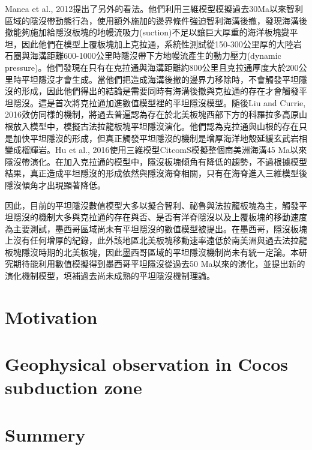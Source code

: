 Manea et al., 2012提出了另外的看法。他們利用三維模型模擬過去30Ma以來智利區域的隱沒帶動態行為，使用額外施加的邊界條件強迫智利海溝後撤，發現海溝後撤能夠施加給隱沒板塊的地幔流吸力(suction)不足以讓巨大厚重的海洋板塊變平坦，因此他們在模型上覆板塊加上克拉通，系統性測試從150-300公里厚的大陸岩石圈與海溝距離600-1000公里時隱沒帶下方地幔流產生的動力壓力(dynamic pressure)。他們發現在只有在克拉通與海溝距離約800公里且克拉通厚度大於200公里時平坦隱沒才會生成。當他們把造成海溝後撤的邊界力移除時，不會觸發平坦隱沒的形成，因此他們得出的結論是需要同時有海溝後撤與克拉通的存在才會觸發平坦隱沒。這是首次將克拉通加進數值模型裡的平坦隱沒模型。隨後Liu and Currie, 2016效仿同樣的機制，將過去普遍認為存在於北美板塊西部下方的科羅拉多高原山根放入模型中，模擬古法拉龍板塊平坦隱沒演化。他們認為克拉通與山根的存在只是加快平坦隱沒的形成，但真正觸發平坦隱沒的機制是增厚海洋地殼延緩玄武岩相變成榴輝岩。Hu et al., 2016使用三維模型CitcomS模擬整個南美洲海溝45 Ma以來隱沒帶演化。在加入克拉通的模型中，隱沒板塊傾角有降低的趨勢，不過根據模型結果，真正造成平坦隱沒的形成依然與隱沒海脊相關，只有在海脊進入三維模型後隱沒傾角才出現顯著降低。

因此，目前的平坦隱沒數值模型大多以擬合智利、祕魯與法拉龍板塊為主，觸發平坦隱沒的機制大多與克拉通的存在與否、是否有洋脊隱沒以及上覆板塊的移動速度為主要測試，墨西哥區域尚未有平坦隱沒的數值模型被提出。在墨西哥，隱沒板塊上沒有任何增厚的紀錄，此外該地區北美板塊移動速率遠低於南美洲與過去法拉龍板塊隱沒時期的北美板塊，因此墨西哥區域的平坦隱沒機制尚未有統一定論。本研究期待能利用數值模擬得到墨西哥平坦隱沒從過去50 Ma以來的演化，並提出新的演化機制模型，填補過去尚未成熟的平坦隱沒機制理論。


\section{Motivation}

\section{Geophysical observation in Cocos subduction zone}

\section{Summery}
